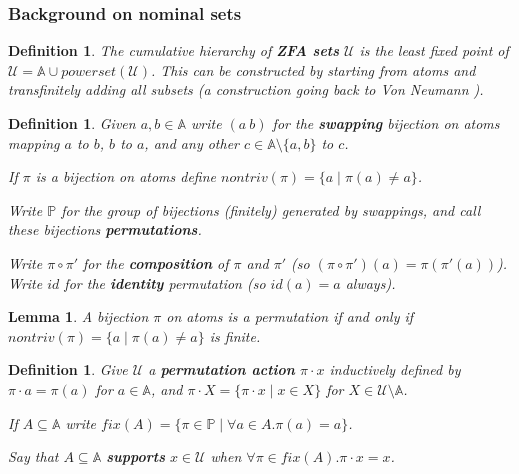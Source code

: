 \documentclass[submission,copyright]{eptcs}
\newtheorem{lemm}[thrm]{Lemma}
\newtheorem{defn}[thrm]{Definition}
\newcommand{\deffont}[1]{\textbf{#1}}
\newcommand{\f}[1]{\ensuremath{\text{$\mathit{#1}$}}}
\newcommand{\fcomp}{\circ}
\newcommand\fix{\f{fix}}
\newcommand\nontriv{\f{nontriv}}
\newcommand{\act}{{\cdot}}
\newcommand{\id}{{id}}
\newcommand\Forall[1]{\forall #1.}
\begin{document}
\subsubsection*{Background on nominal sets}





\begin{defn}
\label{defn.U}
The cumulative hierarchy of \deffont{ZFA sets} $\mathcal U$ is the least fixed point of $\mathcal U=\mathbb A\cup\f{powerset}(\mathcal U)$.
This can be constructed by starting from atoms and transfinitely adding all subsets (a construction going back to Von Neumann \cite{vonneumann:ubewam}).
\end{defn}

\begin{defn}
\label{defn.swap}
\label{def.permutation}
\label{def.nontriv}
Given $a,b\in\mathbb A$ write $(a\ b)$ for the \deffont{swapping} bijection on atoms mapping $a$ to $b$, $b$ to $a$, and any other $c\in\mathbb A\setminus\{a,b\}$ to $c$.

If $\pi$ is a bijection on atoms define $\nontriv(\pi)=\{a\mid \pi(a)\neq a\}$.
 
Write $\mathbb P$ for the group of bijections (finitely) generated by swappings, and call these bijections \deffont{permutations}.

Write $\pi \fcomp \pi'$ for the \deffont{composition} of $\pi$ and $\pi'$ (so $(\pi\circ\pi')(a)=\pi(\pi'(a))$).
Write $\id$ for the \deffont{identity} permutation (so $\id(a)=a$ always). 
\end{defn}

\begin{lemm}
\label{lemm.basic.property.of.permutations}
A bijection $\pi$ on atoms is a permutation if and only if $\nontriv(\pi) = \{a \mid \pi(a) \neq a \}$ is finite.
\end{lemm}


\begin{defn}
\label{defn.perm}
Give $\mathcal U$ a \deffont{permutation action} $\pi\act x$ inductively defined by $\pi\act a=\pi(a)$ for $a\in\mathbb A$, and
$\pi\act X=\{\pi\act x\mid x\in X\}$ for $X\in\mathcal U\setminus\mathbb A$.

If $A\subseteq\mathbb A$ write $\fix(A)=\{\pi\in\mathbb P\mid \Forall{a{\in}A}\pi(a)=a\}$.


Say that $A\subseteq\mathbb A$ \deffont{supports} $x\in\mathcal U$ when $\Forall{\pi{\in}\fix(A)}\pi\act x=x$.
\end{defn}
\end{document}

